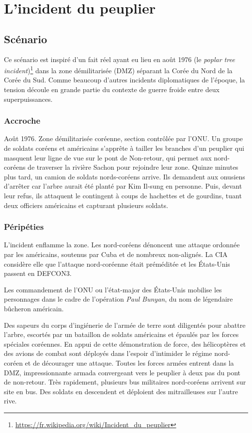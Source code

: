 \chapter{L'incident du peuplier}

\section{Scénario}

Ce scénario est inspiré d'un fait réel ayant eu lieu en août 1976 (le \emph{poplar tree incident})\footnote{\url{https://fr.wikipedia.org/wiki/Incident_du_peuplier}} dans la zone démilitarisée (DMZ) séparant la Corée du Nord de la Corée du Sud.
Comme beaucoup d'autres incidents diplomatiques de l'époque, la tension découle en grande partie du contexte de guerre froide entre deux superpuissances.

\subsection{Accroche}

Août 1976. Zone démilitarisée coréenne, section contrôlée par l'ONU. Un groupe de soldats coréens et américains s'apprête à tailler les branches d'un peuplier qui masquent leur ligne de vue sur le \og pont de Non-retour\fg, qui permet aux nord-coréens de traverser la rivière Sachon pour rejoindre leur zone. Quinze minutes plus tard, un camion de soldats nords-coréens arrive. Ils demandent aux onusiens d'arrêter car l'arbre aurait été planté par Kim Il-sung en personne. Puis, devant leur refus, ils attaquent le contingent à coups de hachettes et de gourdins, tuant deux officiers américains et capturant plusieurs soldats.

\subsection{Péripéties}

L'incident enflamme la zone. Les nord-coréens dénoncent une attaque ordonnée par les américains, soutenus par Cuba et de nombreux non-alignés.
La CIA considère elle que l'attaque nord-coréenne était préméditée et les États-Unis passent en DEFCON3.

Les commandement de l'ONU ou l'état-major des États-Unis mobilise les personnages dans le cadre de l'opération \emph{Paul Bunyan}, du nom de légendaire bûcheron américain.

Des sapeurs du corps d'ingiénerie de l'armée de terre sont diligentés pour abattre l'arbre, escortés par un bataillon de soldats américains et épaulés par les forces spéciales coréennes.
En appui de cette démonstration de force, des hélicoptères et des avions de combat sont déployés dans l'espoir d'intimider le régime nord-coréen et de décourager une attaque.
Toutes les forces armées entrent dans la DMZ, impressionnante armada convergeant vers le peuplier à deux pas du pont de non-retour.
Très rapidement, plusieurs bus militaires nord-coréens arrivent sur site en bus.
Des soldats en descendent et déploient des mitrailleuses sur l'autre rive.


